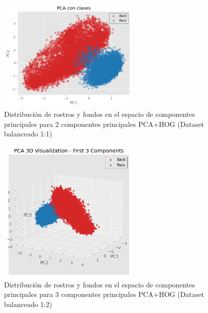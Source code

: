 \documentclass{article}
\begin{document}
\begin{figure}[H]
    \centering
    \includegraphics[width=0.6\textwidth]{tarea_4/imagenes/pca_classes_x1_v1_20_2_components.png}
    \caption{Distribución de rostros y fondos en el espacio de componentes principales para 2 componentes principales PCA+HOG (Dataset balanceado 1:1)}
    \label{fig:pca_classes}
\end{figure}

\begin{figure}[H]
    \centering
    \includegraphics[width=0.6\textwidth]{tarea_4/imagenes/pca_classes_x1_v1_20_3_components.png}
    \caption{Distribución de rostros y fondos en el espacio de componentes principales para 3 componentes principales PCA+HOG (Dataset balanceado 1:2)}
    \label{fig:pca_classes}
\end{figure}
\end{document}
